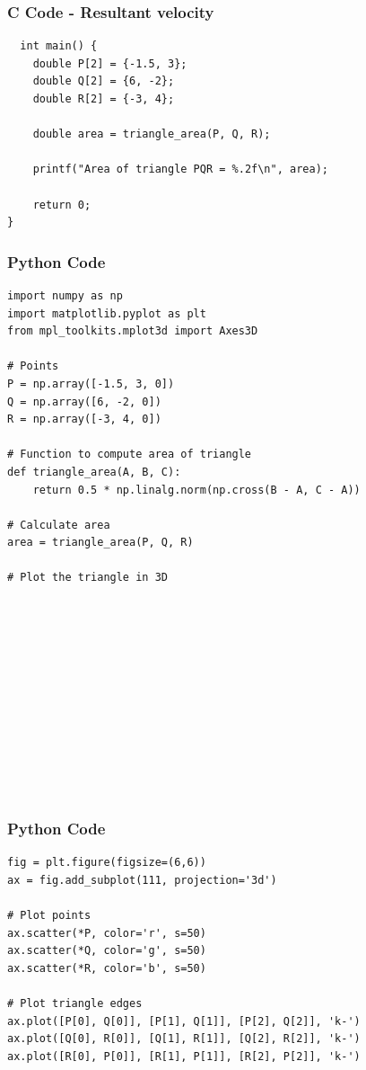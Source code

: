 \documentclass{beamer}
\begin{document}
\begin{frame}[fragile]
    \frametitle{C Code - Resultant velocity}

    \begin{lstlisting}
  int main() {
    double P[2] = {-1.5, 3};
    double Q[2] = {6, -2};
    double R[2] = {-3, 4};

    double area = triangle_area(P, Q, R);
    
    printf("Area of triangle PQR = %.2f\n", area);
    
    return 0;
}

    \end{lstlisting}
\end{frame}
\begin{frame}[fragile]
    \frametitle{Python Code}
    \begin{lstlisting}
import numpy as np
import matplotlib.pyplot as plt
from mpl_toolkits.mplot3d import Axes3D

# Points
P = np.array([-1.5, 3, 0])
Q = np.array([6, -2, 0])
R = np.array([-3, 4, 0])

# Function to compute area of triangle
def triangle_area(A, B, C):
    return 0.5 * np.linalg.norm(np.cross(B - A, C - A))

# Calculate area
area = triangle_area(P, Q, R)

# Plot the triangle in 3D













    \end{lstlisting}
\end{frame}

\begin{frame}[fragile]
    \frametitle{Python Code}
    \begin{lstlisting}
fig = plt.figure(figsize=(6,6))
ax = fig.add_subplot(111, projection='3d')

# Plot points
ax.scatter(*P, color='r', s=50)
ax.scatter(*Q, color='g', s=50)
ax.scatter(*R, color='b', s=50)

# Plot triangle edges
ax.plot([P[0], Q[0]], [P[1], Q[1]], [P[2], Q[2]], 'k-')
ax.plot([Q[0], R[0]], [Q[1], R[1]], [Q[2], R[2]], 'k-')
ax.plot([R[0], P[0]], [R[1], P[1]], [R[2], P[2]], 'k-')


    \end{lstlisting}
\end{frame}
\end{document}
